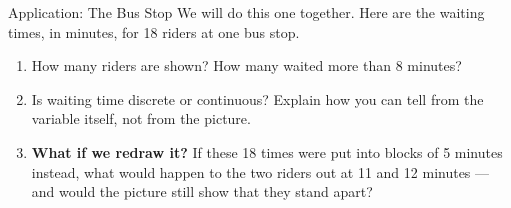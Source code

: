 \documentclass[12pt]{article}
\newcommand{\answerspace}[2]{\par\nopagebreak\noindent\begin{minipage}[t][#1][t]{\linewidth}%
  \color{keyred}\bfseries #2\end{minipage}\par}
\begin{document}
\boxguard[14]
\begin{notesbox}{Application: The Bus Stop}
We will do this one together. Here are the waiting times, in minutes, for 18 riders at one bus
stop.

\vspace{3pt}
\begin{center}
\end{center}
\vspace{2pt}

\begin{enumerate}[label=\textbf{\alph*.}, leftmargin=1.8em, itemsep=6pt]
  \item How many riders are shown? \blank{2.0cm} \quad How many waited more than 8 minutes?
        \blank{2.0cm}
  \item Is waiting time discrete or continuous? \blank{2.6cm} \quad Explain how you can tell
        from the variable itself, not from the picture.
        \answerspace{1.6cm}{}
  \item \textbf{What if we redraw it?} If these 18 times were put into blocks of 5 minutes
        instead, what would happen to the two riders out at 11 and 12 minutes --- and would the
        picture still show that they stand apart?
        \answerspace{1.8cm}{}
\end{enumerate}
\end{notesbox}
\end{document}
